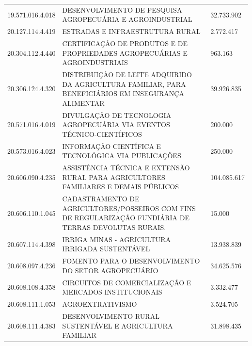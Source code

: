 \documentclass{article}
\begin{document}
\begin{longtable}[c]{m{3cm}|m{12cm}|m{2cm}}
\multicolumn{1}{C{3cm}|}{19.571.016.4.018} & \multicolumn{1}{L{12cm}|}{DESENVOLVIMENTO DE PESQUISA AGROPECUÁRIA E AGROINDUSTRIAL} & \multicolumn{1}{R{2cm}}{32.733.902} \\
\multicolumn{1}{C{3cm}|}{20.127.114.4.419} & \multicolumn{1}{L{12cm}|}{ESTRADAS E INFRAESTRUTURA RURAL} & \multicolumn{1}{R{2cm}}{2.772.417} \\
\multicolumn{1}{C{3cm}|}{20.304.112.4.440} & \multicolumn{1}{L{12cm}|}{CERTIFICAÇÃO DE PRODUTOS E DE PROPRIEDADES AGROPECUÁRIAS E AGROINDUSTRIAIS} & \multicolumn{1}{R{2cm}}{963.163} \\
\multicolumn{1}{C{3cm}|}{20.306.124.4.320} & \multicolumn{1}{L{12cm}|}{DISTRIBUIÇÃO DE LEITE ADQUIRIDO DA AGRICULTURA FAMILIAR, PARA BENEFICIÁRIOS EM INSEGURANÇA ALIMENTAR} & \multicolumn{1}{R{2cm}}{39.926.835} \\
\multicolumn{1}{C{3cm}|}{20.571.016.4.019} & \multicolumn{1}{L{12cm}|}{DIVULGAÇÃO DE TECNOLOGIA AGROPECUÁRIA VIA EVENTOS TÉCNICO-CIENTÍFICOS} & \multicolumn{1}{R{2cm}}{200.000} \\
\multicolumn{1}{C{3cm}|}{20.573.016.4.023} & \multicolumn{1}{L{12cm}|}{INFORMAÇÃO CIENTÍFICA E TECNOLÓGICA VIA PUBLICAÇÕES} & \multicolumn{1}{R{2cm}}{250.000} \\
\multicolumn{1}{C{3cm}|}{20.606.090.4.235} & \multicolumn{1}{L{12cm}|}{ASSISTÊNCIA TÉCNICA E EXTENSÃO RURAL PARA AGRICULTORES FAMILIARES E DEMAIS PÚBLICOS} & \multicolumn{1}{R{2cm}}{104.085.617} \\
\multicolumn{1}{C{3cm}|}{20.606.110.1.045} & \multicolumn{1}{L{12cm}|}{CADASTRAMENTO DE AGRICULTORES/POSSEIROS COM FINS DE REGULARIZAÇÃO FUNDIÁRIA DE TERRAS DEVOLUTAS RURAIS.} & \multicolumn{1}{R{2cm}}{15.000} \\
\multicolumn{1}{C{3cm}|}{20.607.114.4.398} & \multicolumn{1}{L{12cm}|}{IRRIGA MINAS - AGRICULTURA IRRIGADA SUSTENTÁVEL} & \multicolumn{1}{R{2cm}}{13.938.839} \\
\multicolumn{1}{C{3cm}|}{20.608.097.4.236} & \multicolumn{1}{L{12cm}|}{FOMENTO PARA O DESENVOLVIMENTO DO SETOR AGROPECUÁRIO} & \multicolumn{1}{R{2cm}}{34.625.576} \\
\multicolumn{1}{C{3cm}|}{20.608.108.4.358} & \multicolumn{1}{L{12cm}|}{CIRCUITOS DE COMERCIALIZAÇÃO E MERCADOS INSTITUCIONAIS} & \multicolumn{1}{R{2cm}}{3.332.477} \\
\multicolumn{1}{C{3cm}|}{20.608.111.1.053} & \multicolumn{1}{L{12cm}|}{AGROEXTRATIVISMO} & \multicolumn{1}{R{2cm}}{3.524.705} \\
\multicolumn{1}{C{3cm}|}{20.608.111.4.383} & \multicolumn{1}{L{12cm}|}{DESENVOLVIMENTO RURAL SUSTENTÁVEL E AGRICULTURA FAMILIAR} & \multicolumn{1}{R{2cm}}{31.898.435} \\

\end{longtable}
\end{document}

